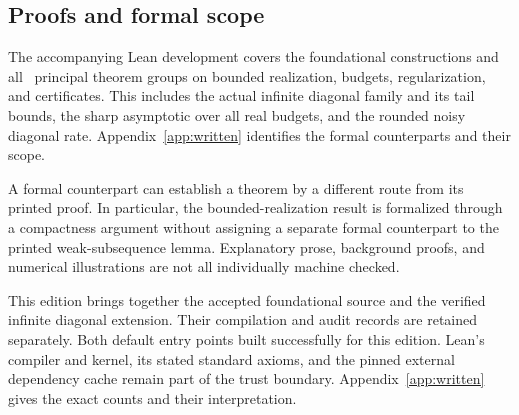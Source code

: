 \documentclass[11pt]{article}
\begin{document}
\subsection*{Proofs and formal scope}
The accompanying Lean development covers the foundational constructions and all \EditionPrincipalGroups\ principal theorem groups on bounded realization, budgets, regularization, and certificates. This includes the actual infinite diagonal family and its tail bounds, the sharp asymptotic over all real budgets, and the rounded noisy diagonal rate. Appendix~\ref{app:written} identifies the formal counterparts and their scope.

A formal counterpart can establish a theorem by a different route from its printed proof. In particular, the bounded-realization result is formalized through a compactness argument without assigning a separate formal counterpart to the printed weak-subsequence lemma. Explanatory prose, background proofs, and numerical illustrations are not all individually machine checked.

This edition brings together the accepted foundational source and the verified infinite diagonal extension. Their compilation and audit records are retained separately. Both default entry points built successfully for this edition. Lean's compiler and kernel, its stated standard axioms, and the pinned external dependency cache remain part of the trust boundary. Appendix~\ref{app:written} gives the exact counts and their interpretation.

\clearpage\begingroup\setlength{\parskip}{0pt}\tableofcontents\endgroup
\clearpage{}





















\appendix






\end{document}
